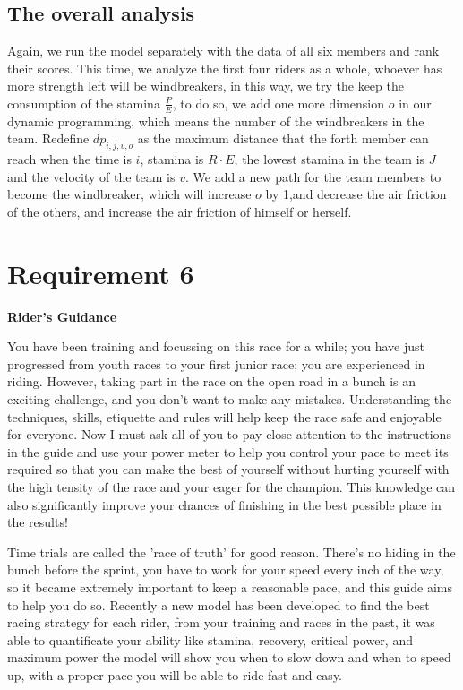 \documentclass[12pt]{article}
\begin{document}
\subsection{The overall analysis}
Again, we run the model separately with the data of all six members and rank their scores. This time, we analyze the first four riders as a whole, whoever has more strength
left will be windbreakers, in this way, we try the keep the consumption of the stamina $\frac{P}{E}$, to do so, we add one more dimension $o$ in our dynamic programming, which
means the number of the windbreakers in the team. Redefine $dp_{i,j,v,o}$ as the maximum distance that the forth member can reach when the time is $i$, stamina is $R\cdot E$,
the lowest stamina in the team is $J$ and the velocity of the team is $v$. We add a new path for the team members to become the windbreaker, which will increase $o$ by 1,and
decrease the air friction of the others, and increase the air friction of himself or herself.


\newpage
\section{Requirement 6}
\begin{center}
    \huge \textbf{Rider's Guidance}
\end{center}\large
You have been training and focussing on this race for a while; you  have just progressed from youth races to your first junior race; you are experienced in riding.
However, taking part in the race on the open road in a bunch is an exciting challenge, and you don't want to make any mistakes.
Understanding the techniques, skills, etiquette and rules will help keep the race safe and enjoyable for everyone. Now I must ask all of you to pay close attention to the instructions in the guide and use your power meter
to help you control your pace to meet its required so that you can make the best of yourself without hurting yourself with the high tensity of the race and your eager for
the champion. This knowledge can also significantly improve your chances of finishing in the best possible place in the results!

Time trials are called the 'race of truth' for good reason. There's no hiding in the bunch before the sprint, you have to work for your speed every inch of the way, so it
became extremely important to keep a reasonable pace, and this guide aims to help you do so.
Recently a new model has been developed to find the best racing strategy for each rider, from your training and races in the past, it was able to quantificate your ability
like stamina, recovery, critical power, and maximum power the model will show you when to slow down and when to speed up, with a proper pace you will be able to ride
fast and easy.
\end{document}
